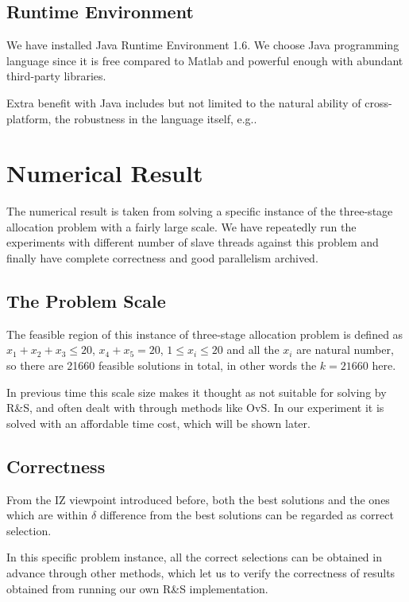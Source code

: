 \documentclass[12pt,a4]{report}
\begin{document}
\subsection{Runtime Environment}

We have installed Java Runtime Environment 1.6. We choose Java programming language since it is free compared to Matlab and powerful enough with abundant third-party libraries.

Extra benefit with Java includes but not limited to the natural ability of cross-platform, the robustness in the language itself, e.g..

\section{Numerical Result}

The numerical result is taken from solving a specific instance of the three-stage allocation problem with a fairly large scale. We have repeatedly run the experiments with different number of slave threads against this problem and finally have complete correctness and good parallelism archived.

\subsection{The Problem Scale}

The feasible region of this instance of three-stage allocation problem is defined as $x_1 + x_2 + x_3 \leqslant 20$, $x_4 + x_5 = 20$, $1 \leqslant x_i \leqslant 20$ and all the $x_i$ are natural number, so there are 21660 feasible solutions in total, in other words the $k = 21660$ here.

In previous time this scale size makes it thought as not suitable for solving by R\&S, and often dealt with through methods like OvS. In our experiment it is solved with an affordable time cost, which will be shown later.

\subsection{Correctness}

From the IZ viewpoint introduced before, both the best solutions and the ones which are within $\delta$ difference from the best solutions can be regarded as correct selection.

In this specific problem instance, all the correct selections can be obtained in advance through other methods, which let us to verify the correctness of results obtained from running our own R\&S implementation.
\end{document}
